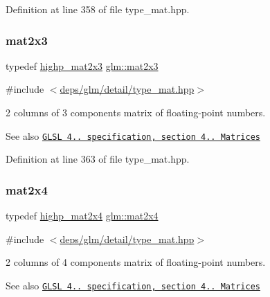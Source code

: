 Definition at line 358 of file type\+\_\+mat.\+hpp.

\mbox{\label{group__core__types_gaea02797b8231f6dd9380345f6ff12155}} 
\subsubsection{\texorpdfstring{mat2x3}{mat2x3}}
{\footnotesize\ttfamily typedef \hyperlink{group__core__precision_ga9d61903aea75d6932829cd049f2e622a}{highp\+\_\+mat2x3} \hyperlink{group__core__types_gaea02797b8231f6dd9380345f6ff12155}{glm\+::mat2x3}}



{\ttfamily \#include $<$\hyperlink{type__mat_8hpp}{deps/glm/detail/type\+\_\+mat.\+hpp}$>$}

2 columns of 3 components matrix of floating-\/point numbers.

\begin{DoxySeeAlso}{See also}
\href{http://www.opengl.org/registry/doc/GLSLangSpec.4.20.8.pdf}{\tt G\+L\+SL 4.. specification, section 4.. Matrices} 
\end{DoxySeeAlso}


Definition at line 363 of file type\+\_\+mat.\+hpp.

\mbox{\label{group__core__types_gaa9bfb36efaf88ecad32369ec8a01d901}} 
\subsubsection{\texorpdfstring{mat2x4}{mat2x4}}
{\footnotesize\ttfamily typedef \hyperlink{group__core__precision_ga4ad5980b248b3d4dcf014db8fa4495cf}{highp\+\_\+mat2x4} \hyperlink{group__core__types_gaa9bfb36efaf88ecad32369ec8a01d901}{glm\+::mat2x4}}



{\ttfamily \#include $<$\hyperlink{type__mat_8hpp}{deps/glm/detail/type\+\_\+mat.\+hpp}$>$}

2 columns of 4 components matrix of floating-\/point numbers.

\begin{DoxySeeAlso}{See also}
\href{http://www.opengl.org/registry/doc/GLSLangSpec.4.20.8.pdf}{\tt G\+L\+SL 4.. specification, section 4.. Matrices} 
\end{DoxySeeAlso}


